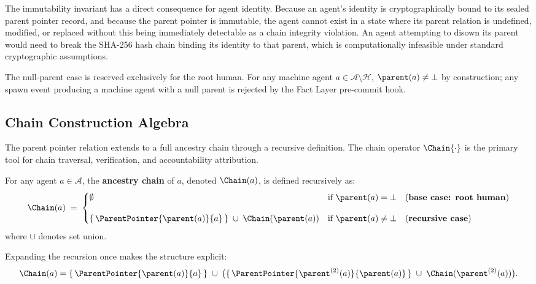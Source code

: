 The immutability invariant has a direct consequence for agent identity. Because an agent's identity is cryptographically bound to its sealed parent pointer record, and because the parent pointer is immutable, the agent cannot exist in a state where its parent relation is undefined, modified, or replaced without this being immediately detectable as a chain integrity violation. An agent attempting to disown its parent would need to break the SHA-256 hash chain binding its identity to that parent, which is computationally infeasible under standard cryptographic assumptions.

The null-parent case is reserved exclusively for the root human. For any machine agent $a \in \mathcal{A} \setminus \mathcal{H}$, $\parent(a) \neq \bot$ by construction; any spawn event producing a machine agent with a null parent is rejected by the Fact Layer pre-commit hook.

\subsection{Chain Construction Algebra}
\label{sec:chain_construction}

The parent pointer relation extends to a full ancestry chain through a recursive definition. The chain operator $\Chain{\cdot}$ is the primary tool for chain traversal, verification, and accountability attribution.

\begin{definition}
\label{def:chain}
For any agent $a \in \mathcal{A}$, the \textbf{ancestry chain} of $a$, denoted $\Chain(a)$, is defined recursively as:
\begin{equation}
\Chain(a) \;=\;
\begin{cases}
\emptyset & \text{if } \parent(a) = \bot \quad \text{(\textbf{base case: root human})} \\[10pt]
\{\,\ParentPointer{\parent(a)}{a}\,\} \;\cup\; \Chain(\parent(a)) & \text{if } \parent(a) \neq \bot \quad \text{(\textbf{recursive case})}
\end{cases}
\label{eq:chain_recursive}
\end{equation}
where $\cup$ denotes set union.
\end{definition}

Expanding the recursion once makes the structure explicit:
\begin{equation}
\Chain(a) = \{\,\ParentPointer{\parent(a)}{a}\,\} \;\cup\; \bigl(\{\,\ParentPointer{\parent^{(2)}(a)}{\parent(a)}\,\} \;\cup\; \Chain(\parent^{(2)}(a))\bigr).
\label{eq:chain_expanded}
\end{equation}

